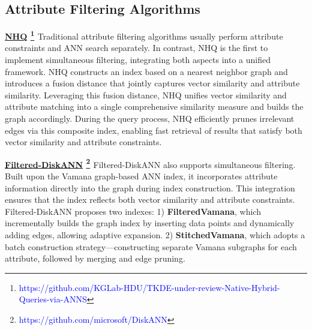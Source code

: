 \documentclass[sigconf, nonacm]{acmart}
\begin{document}
{	\subsection{Attribute Filtering Algorithms}
	

	\noindent\textbf{\underline{NHQ} \footnote{\textcolor{blue}{https://github.com/KGLab-HDU/TKDE-under-review-Native-Hybrid-Queries-via-ANNS}} \cite{NHQ}}
	Traditional attribute filtering algorithms usually perform attribute constraints and ANN search separately. In contrast, NHQ is the first to implement simultaneous filtering, integrating both aspects into a unified framework. NHQ constructs an index based on a nearest neighbor graph and introduces a fusion distance that jointly captures vector similarity and attribute similarity. Leveraging this fusion distance, NHQ unifies vector similarity and attribute matching into a single comprehensive similarity measure and builds the graph accordingly. During the query process, NHQ efficiently prunes irrelevant edges via this composite index, enabling fast retrieval of results that satisfy both vector similarity and attribute constraints.
	
	\noindent\textbf{\underline{Filtered-DiskANN} \footnote{\textcolor{blue}{https://github.com/microsoft/DiskANN}} \cite{Filtered-diskann}}
	Filtered-DiskANN also supports simultaneous filtering. Built upon the Vamana \cite{diskann} graph-based ANN index, it incorporates attribute information directly into the graph during index construction. This integration ensures that the index reflects both vector similarity and attribute constraints. 
	Filtered-DiskANN proposes two indexes:  
	1) \textbf{FilteredVamana}, which incrementally builds the graph index by inserting data points and dynamically adding edges, allowing adaptive expansion.  
	2) \textbf{StitchedVamana}, which adopts a batch construction strategy—constructing separate Vamana subgraphs for each attribute, followed by merging and edge pruning.
	
}
\end{document}
